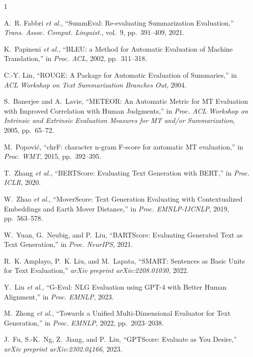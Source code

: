 \documentclass[journal]{IEEEtran}
\begin{document}

\begin{thebibliography}{1}

A.~R. Fabbri \emph{et al.},
``SummEval: Re-evaluating Summarization Evaluation,''
\emph{Trans. Assoc. Comput. Linguist.}, vol.~9, pp.~391--409, 2021.

K.~Papineni \emph{et al.},
``BLEU: a Method for Automatic Evaluation of Machine Translation,''
in \emph{Proc. ACL}, 2002, pp.~311--318.

C.-Y. Lin,
``ROUGE: A Package for Automatic Evaluation of Summaries,''
in \emph{ACL Workshop on Text Summarization Branches Out}, 2004.

S.~Banerjee and A.~Lavie,
``METEOR: An Automatic Metric for MT Evaluation with Improved
Correlation with Human Judgments,''
in \emph{Proc. ACL Workshop on Intrinsic and Extrinsic Evaluation
Measures for MT and/or Summarization}, 2005, pp.~65--72.

M.~Popovi\'c,
``chrF: character n-gram F-score for automatic MT evaluation,''
in \emph{Proc. WMT}, 2015, pp.~392--395.

T.~Zhang \emph{et al.},
``BERTScore: Evaluating Text Generation with BERT,''
in \emph{Proc. ICLR}, 2020.

W.~Zhao \emph{et al.},
``MoverScore: Text Generation Evaluating with Contextualized
Embeddings and Earth Mover Distance,''
in \emph{Proc. EMNLP-IJCNLP}, 2019, pp.~563--578.

W.~Yuan, G.~Neubig, and P.~Liu,
``BARTScore: Evaluating Generated Text as Text Generation,''
in \emph{Proc. NeurIPS}, 2021.

R.~K. Amplayo, P.~K. Liu, and M.~Lapata,
``SMART: Sentences as Basic Units for Text Evaluation,''
\emph{arXiv preprint arXiv:2208.01030}, 2022.

Y.~Liu \emph{et al.},
``G-Eval: NLG Evaluation using GPT-4 with Better Human Alignment,''
in \emph{Proc. EMNLP}, 2023.

M.~Zhong \emph{et al.},
``Towards a Unified Multi-Dimensional Evaluator for Text
Generation,''
in \emph{Proc. EMNLP}, 2022, pp.~2023--2038.

J.~Fu, S.-K.~Ng, Z.~Jiang, and P.~Liu,
``GPTScore: Evaluate as You Desire,''
\emph{arXiv preprint arXiv:2302.04166}, 2023.


\end{thebibliography}
\end{document}
